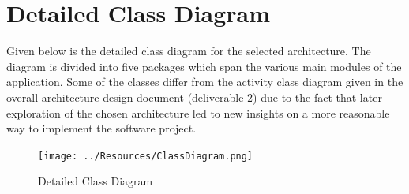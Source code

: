 \documentclass[]{article}
\begin{document}
\section{Detailed Class Diagram}
\label{sec:detailed_class_diagram}
Given below is the detailed class diagram for the selected architecture. The diagram is divided into five packages which span the various main modules of the application.
Some of the classes differ from the activity class diagram given in the overall architecture design document (deliverable 2) due to the fact that later exploration of the chosen
architecture led to new insights on a more reasonable way to implement the software project.

\begin{figure}[H]
	\texttt{[image: ../Resources/ClassDiagram.png]}
	\caption{Detailed Class Diagram}
\end{figure}

\newpage

\appendix
\end{document}
